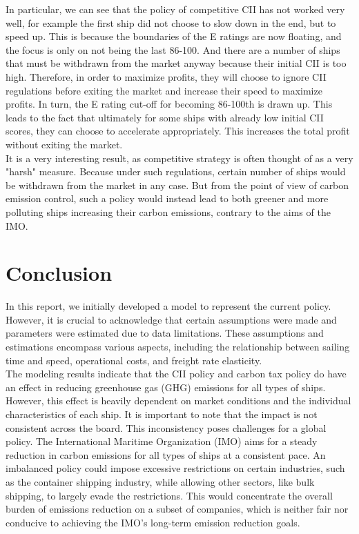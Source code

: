 \documentclass[a4paper,12pt]{article}
\begin{document}
In particular, we can see that the policy of competitive CII has not worked very well, for example the first ship did not choose to slow down in the end, but to speed up.
This is because the boundaries of the E ratings are now floating, and the focus is only on not being the last 86-100.
And there are a number of ships that must be withdrawn from the market anyway because their initial CII is too high.
Therefore, in order to maximize profits, they will choose to ignore CII regulations before exiting the market and increase their speed to maximize profits.
In turn, the E rating cut-off for becoming 86-100th is drawn up. This leads to the fact that ultimately for some ships with already low initial CII scores, they can choose to accelerate appropriately.
This increases the total profit without exiting the market.\\

It is a very interesting result, as competitive strategy is often thought of as a very "harsh" measure.
Because under such regulations, certain number of ships would be withdrawn from the market in any case.
But from the point of view of carbon emission control, such a policy would instead lead to both greener and more polluting ships increasing their carbon emissions, contrary to the aims of the IMO.

\newpage
\section{Conclusion}

In this report, we initially developed a model to represent the current policy.
However, it is crucial to acknowledge that certain assumptions were made and parameters were estimated due to data limitations.
These assumptions and estimations encompass various aspects, including the relationship between sailing time and speed, operational costs, and freight rate elasticity.\\

The modeling results indicate that the CII policy and carbon tax policy do have an effect in reducing greenhouse gas (GHG) emissions for all types of ships.
However, this effect is heavily dependent on market conditions and the individual characteristics of each ship.
It is important to note that the impact is not consistent across the board.
This inconsistency poses challenges for a global policy.
The International Maritime Organization (IMO) aims for a steady reduction in carbon emissions for all types of ships at a consistent pace.
An imbalanced policy could impose excessive restrictions on certain industries, such as the container shipping industry, while allowing other sectors, like bulk shipping, to largely evade the restrictions.
This would concentrate the overall burden of emissions reduction on a subset of companies, which is neither fair nor conducive to achieving the IMO's long-term emission reduction goals.\\
\end{document}
